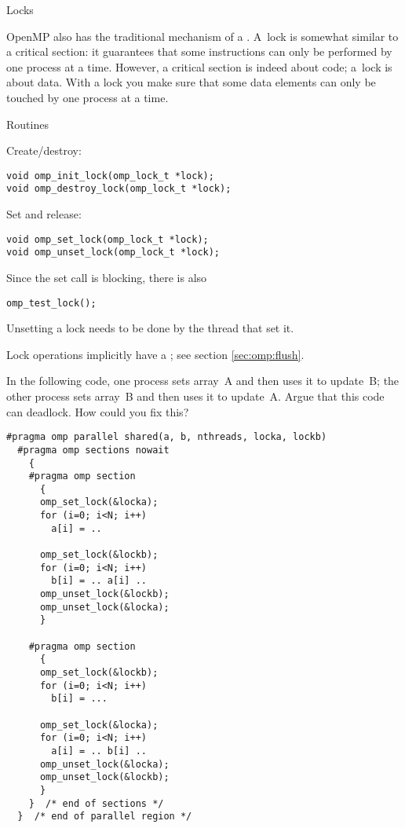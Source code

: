 
 {Locks}
\label{sec:ompref:locks}

OpenMP also has the traditional mechanism of a . A~lock is somewhat similar to 
a critical section: it guarantees that some instructions can only be performed by one
process at a time. However, a critical section is indeed about code; a~lock is about data.
With a lock you make sure that some data elements can only be touched by one process at a time.

 {Routines}

Create/destroy:
\begin{lstlisting}
void omp_init_lock(omp_lock_t *lock);
void omp_destroy_lock(omp_lock_t *lock);
\end{lstlisting}
Set and release:
\begin{lstlisting}
void omp_set_lock(omp_lock_t *lock);
void omp_unset_lock(omp_lock_t *lock);
\end{lstlisting}
Since the set call is blocking, there is also 
\begin{lstlisting}
omp_test_lock();
\end{lstlisting}

Unsetting a lock needs to be done by the thread that set it.

Lock operations implicitly have a ;
see section \ref{sec:omp:flush}.

\begin{exercise}
  \label{ex:loc-deadlock}
  In the following code, one process sets array~A and then uses it to
  update~B; the other process sets array~B and then uses it to
  update~A.
  Argue that this code can deadlock. How could you fix this?
\begin{lstlisting}
#pragma omp parallel shared(a, b, nthreads, locka, lockb)
  #pragma omp sections nowait
    {
    #pragma omp section
      {
      omp_set_lock(&locka);
      for (i=0; i<N; i++)
        a[i] = ..

      omp_set_lock(&lockb);
      for (i=0; i<N; i++)
        b[i] = .. a[i] ..
      omp_unset_lock(&lockb);
      omp_unset_lock(&locka);
      }

    #pragma omp section
      {
      omp_set_lock(&lockb);
      for (i=0; i<N; i++)
        b[i] = ...

      omp_set_lock(&locka);
      for (i=0; i<N; i++)
        a[i] = .. b[i] ..
      omp_unset_lock(&locka);
      omp_unset_lock(&lockb);
      }
    }  /* end of sections */
  }  /* end of parallel region */
\end{lstlisting}
\end{exercise}

